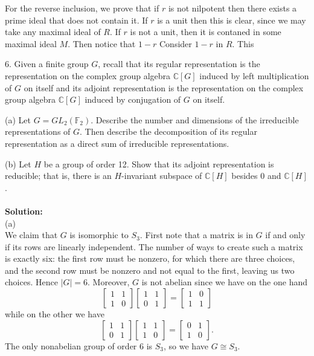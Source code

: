 \documentclass[11pt]{article}
\newcommand{\F}{\mathbb{F}}
\newcommand{\C}{\mathbb{C}}
\begin{document}
For the reverse inclusion, we prove that if $r$ is not nilpotent then there exists a prime ideal that does not contain it. If $r$ is a unit then this is clear, since we may take any maximal ideal of $R$. If $r$ is not a unit, then it is contaned in some maximal ideal $M$. Then notice that $1-r$ Consider $1-r$ in $R$. This 

\newpage



6. Given a finite group $G$, recall that its regular representation is the representation on
the complex group algebra $\C[G]$ induced by left multiplication of $G$ on itself and its
adjoint representation is the representation on the complex group algebra $\C[G]$ induced
by conjugation of $G$ on itself.

(a) Let $G = GL_2(\F_2)$. Describe the number and dimensions of the irreducible representations
of $G$. Then describe the decomposition of its regular representation as
a direct sum of irreducible representations.


(b) Let $H$ be a group of order 12. Show that its adjoint representation is reducible;
that is, there is an $H$-invariant subspace of $\C[H]$ besides 0 and $\C[H]$.\\\\
\textbf{Solution:}\\
(a)\\
We claim that $G$ is isomorphic to $S_3$. First note that a matrix is in $G$ if and only if its rows are linearly independent. The number of ways to create such a matrix is exactly six: the first row must be nonzero, for which there are three choices, and the second row must be nonzero and not equal to the first, leaving us two choices. Hence $|G| = 6$. Moreover, $G$ is not abelian since we have on the one hand\[
\begin{bmatrix}
1&1\\
1&0
\end{bmatrix}\begin{bmatrix}
1&1\\
0&1
\end{bmatrix} = \begin{bmatrix}
1&0\\
1&1
\end{bmatrix}
\]
while on the other we have\[
\begin{bmatrix}
1&1\\
0&1
\end{bmatrix}\begin{bmatrix}
1&1\\
1&0
\end{bmatrix} = \begin{bmatrix}
0&1\\
1&0
\end{bmatrix}.
\]
The only nonabelian group of order 6 is $S_3$, so we have $G \cong S_3$.
\end{document}
